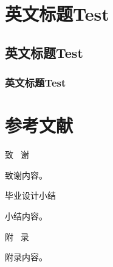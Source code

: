 \documentclass{nwputhesis}
\begin{document}
\section{英文标题Test}
\subsection{英文标题Test}
\subsubsection{英文标题Test}
\makespace
\section*{参考文献}
\begingroup  %
\renewcommand{\section}[2]{}

\addtolength{\itemsep}{-0.6em} %
\begin{spacing}{1.0}           %
    
\end{spacing}


\makespace %
\section*{致谢}
\begin{center}
    { \blackti \fontsize{16.0600pt}{1.25}致 \, 谢}
\end{center}
致谢内容。

\section*{毕业设计小结}
\makespace
\begin{center}
    { \blackti \fontsize{16.0600pt}{1.25}毕业设计小结}
\end{center}
小结内容。

\makespace
\section*{附录}
\begin{center}
    { \blackti \fontsize{16.0600pt}{1.25}附 \, 录}
\end{center}
附录内容。
\end{document}

